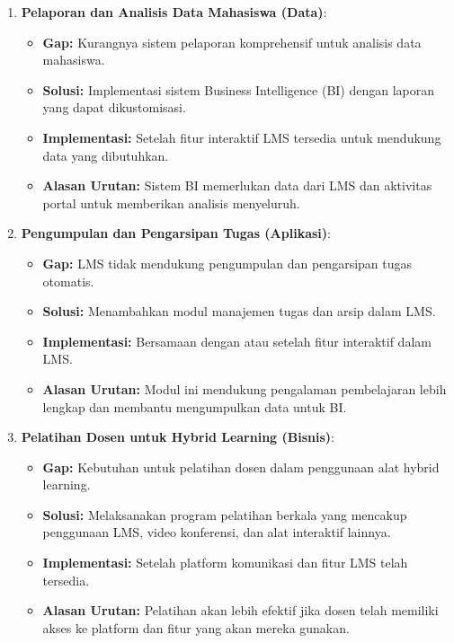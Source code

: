 \begin{enumerate}
	\item \textbf{Pelaporan dan Analisis Data Mahasiswa (Data)}:
	\begin{itemize}
		\item \textbf{Gap:} Kurangnya sistem pelaporan komprehensif untuk analisis data mahasiswa.
		\item \textbf{Solusi:} Implementasi sistem Business Intelligence (BI) dengan laporan yang dapat dikustomisasi.
		\item \textbf{Implementasi:} Setelah fitur interaktif LMS tersedia untuk mendukung data yang dibutuhkan.
		\item \textbf{Alasan Urutan:} Sistem BI memerlukan data dari LMS dan aktivitas portal untuk memberikan analisis menyeluruh.
	\end{itemize}
	
	\item \textbf{Pengumpulan dan Pengarsipan Tugas (Aplikasi)}:
	\begin{itemize}
		\item \textbf{Gap:} LMS tidak mendukung pengumpulan dan pengarsipan tugas otomatis.
		\item \textbf{Solusi:} Menambahkan modul manajemen tugas dan arsip dalam LMS.
		\item \textbf{Implementasi:} Bersamaan dengan atau setelah fitur interaktif dalam LMS.
		\item \textbf{Alasan Urutan:} Modul ini mendukung pengalaman pembelajaran lebih lengkap dan membantu mengumpulkan data untuk BI.
	\end{itemize}
	
	\item \textbf{Pelatihan Dosen untuk Hybrid Learning (Bisnis)}:
	\begin{itemize}
		\item \textbf{Gap:} Kebutuhan untuk pelatihan dosen dalam penggunaan alat hybrid learning.
		\item \textbf{Solusi:} Melaksanakan program pelatihan berkala yang mencakup penggunaan LMS, video konferensi, dan alat interaktif lainnya.
		\item \textbf{Implementasi:} Setelah platform komunikasi dan fitur LMS telah tersedia.
		\item \textbf{Alasan Urutan:} Pelatihan akan lebih efektif jika dosen telah memiliki akses ke platform dan fitur yang akan mereka gunakan.
	\end{itemize}
	

\end{enumerate}
